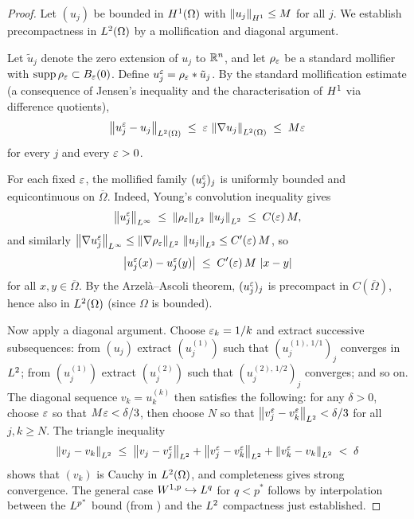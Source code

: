 \begin{proof}
  Let $(u_{j})$ be bounded in $H^{1}(\Omega)$ with
  $\left\lVert u_{j} \right\rVert_{H^{1}} \le M$ for all $j$.  We establish precompactness in
  $L^{2}(\Omega)$ by a mollification and diagonal argument.

  Let $\tilde{u}_{j}$ denote the zero extension of $u_{j}$ to $\mathbb{R}^{n}$, and let
  $\rho_{\varepsilon}$ be a standard mollifier with $\operatorname{supp} \rho_{\varepsilon} \subset B_{\varepsilon}(0)$.
  Define $u_{j}^{\varepsilon} = \rho_{\varepsilon} * \tilde{u}_{j}$.  By the standard mollification
  estimate (a consequence of Jensen's inequality and the characterisation of $H^{1}$
  via difference quotients),
  \[
    \left\lVert u_{j}^{\varepsilon} - u_{j} \right\rVert_{L^{2}(\Omega)}
    \;\le\;
    \varepsilon\,\left\lVert \nabla u_{j} \right\rVert_{L^{2}(\Omega)}
    \;\le\;
    M\varepsilon
  \]
  for every $j$ and every $\varepsilon > 0$.

  For each fixed $\varepsilon$, the mollified family $(u_{j}^{\varepsilon})_{j}$ is uniformly bounded
  and equicontinuous on $\overline{\Omega}$.  Indeed, Young's convolution inequality gives
  \[
    \left\lVert u_{j}^{\varepsilon} \right\rVert_{L^{\infty}}
    \;\le\;
    \left\lVert \rho_{\varepsilon} \right\rVert_{L^{2}}\,\left\lVert u_{j} \right\rVert_{L^{2}}
    \;\le\;
    C(\varepsilon)\,M,
  \]
  and similarly
  $\left\lVert \nabla u_{j}^{\varepsilon} \right\rVert_{L^{\infty}} \le
  \left\lVert \nabla \rho_{\varepsilon} \right\rVert_{L^{2}}\,\left\lVert u_{j} \right\rVert_{L^{2}} \le C'(\varepsilon)\,M$, so
  \[
    \left\lvert u_{j}^{\varepsilon}(x) - u_{j}^{\varepsilon}(y) \right\rvert
    \;\le\;
    C'(\varepsilon)\,M\,\left\lvert x - y \right\rvert
  \]
  for all $x, y \in \overline{\Omega}$.  By the Arzel\`{a}--Ascoli theorem, $(u_{j}^{\varepsilon})_{j}$
  is precompact in $C(\overline{\Omega})$, hence also in $L^{2}(\Omega)$ (since $\Omega$
  is bounded).

  Now apply a diagonal argument.  Choose $\varepsilon_{k} = 1/k$ and extract successive
  subsequences: from $(u_{j})$ extract $(u_{j}^{(1)})$ such that
  $(u_{j}^{(1),\,1/1})_{j}$ converges in $L^{2}$; from $(u_{j}^{(1)})$ extract
  $(u_{j}^{(2)})$ such that $(u_{j}^{(2),\,1/2})_{j}$ converges; and so on.  The
  diagonal sequence $v_{k} = u_{k}^{(k)}$ then satisfies the following: for any
  $\delta > 0$, choose $\varepsilon$ so that $M\varepsilon < \delta/3$, then choose $N$ so that
  $\left\lVert v_{j}^{\varepsilon} - v_{k}^{\varepsilon} \right\rVert_{L^{2}} < \delta/3$ for all $j, k \ge N$.  The
  triangle inequality
  \[
    \left\lVert v_{j} - v_{k} \right\rVert_{L^{2}}
    \;\le\;
    \left\lVert v_{j} - v_{j}^{\varepsilon} \right\rVert_{L^{2}}
    + \left\lVert v_{j}^{\varepsilon} - v_{k}^{\varepsilon} \right\rVert_{L^{2}}
    + \left\lVert v_{k}^{\varepsilon} - v_{k} \right\rVert_{L^{2}}
    \;<\;
    \delta
  \]
  shows that $(v_{k})$ is Cauchy in $L^{2}(\Omega)$, and completeness gives strong
  convergence.  The general case $W^{1,p} \hookrightarrow L^{q}$ for $q < p^{*}$ follows
  by interpolation between the $L^{p^{*}}$ bound (from )
  and the $L^{2}$ compactness just established.
\end{proof}

